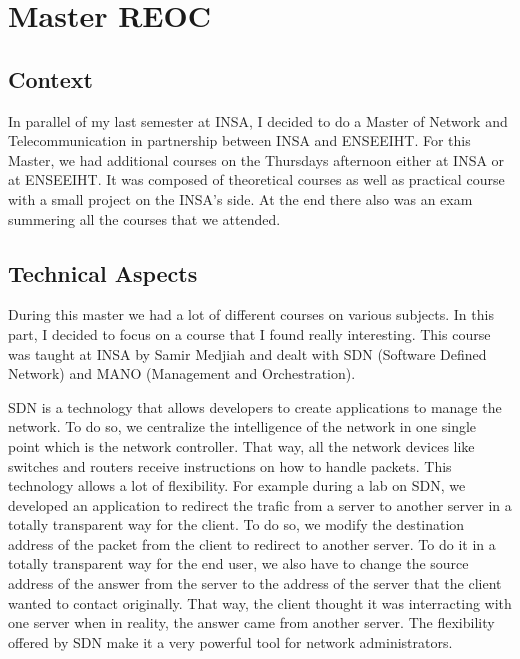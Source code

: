 \section{Master REOC}

\subsection{Context}

In parallel of my last semester at INSA, I decided to do a Master of Network and Telecommunication in partnership between INSA and ENSEEIHT. For this Master, we had additional courses on the Thursdays afternoon either at INSA or at ENSEEIHT. It was composed of theoretical courses as well as practical course with a small project on the INSA's side. At the end there also was an exam summering all the courses that we attended. 

\subsection{Technical Aspects}

During this master we had a lot of different courses on various subjects. In this part, I decided to focus on a course that I found really interesting. This course was taught at INSA by Samir Medjiah and dealt with SDN (Software Defined Network) and MANO (Management and Orchestration). 
\\\par
SDN is a technology that allows developers to create applications to manage the network. To do so, we centralize the intelligence of the network in one single point which is the network controller. That way, all the network devices like switches and routers receive instructions on how to handle packets. This technology allows a lot of flexibility. For example during a lab on SDN, we developed an application to redirect the trafic from a server to another server in a totally transparent way for the client. To do so, we modify the destination address of the packet from the client to redirect to another server. To do it in a totally transparent way for the end user, we also have to change the source address of the answer from the server to the address of the server that the client wanted to contact originally. That way, the client thought it was interracting with one server when in reality, the answer came from another server. The flexibility offered by SDN make it a very powerful tool for network administrators.
\\\par

